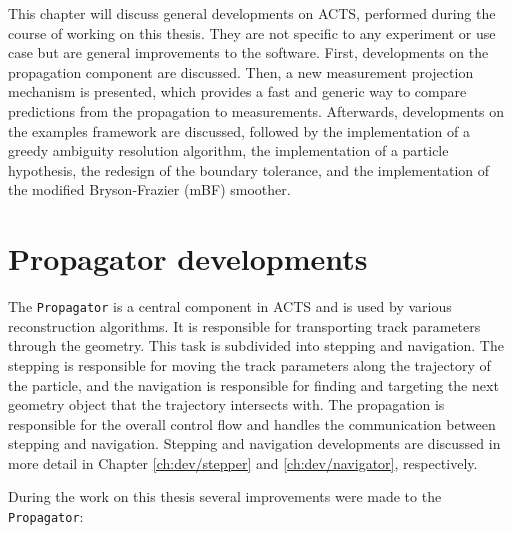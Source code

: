 This chapter will discuss general developments on ACTS, performed during the course of working on this thesis. They are not specific to any experiment or use case but are general improvements to the software. First, developments on the propagation component are discussed. Then, a new measurement projection mechanism is presented, which provides a fast and generic way to compare predictions from the propagation to measurements. Afterwards, developments on the examples framework are discussed, followed by the implementation of a greedy ambiguity resolution algorithm, the implementation of a particle hypothesis, the redesign of the boundary tolerance, and the implementation of the modified Bryson-Frazier (mBF) smoother.

\section{Propagator developments}

The \texttt{Propagator} is a central component in ACTS and is used by various reconstruction algorithms. It is responsible for transporting track parameters through the geometry. This task is subdivided into stepping and navigation. The stepping is responsible for moving the track parameters along the trajectory of the particle, and the navigation is responsible for finding and targeting the next geometry object that the trajectory intersects with. The propagation is responsible for the overall control flow and handles the communication between stepping and navigation. Stepping and navigation developments are discussed in more detail in Chapter \ref{ch:dev/stepper} and \ref{ch:dev/navigator}, respectively.

During the work on this thesis several improvements were made to the \texttt{Propagator}:

